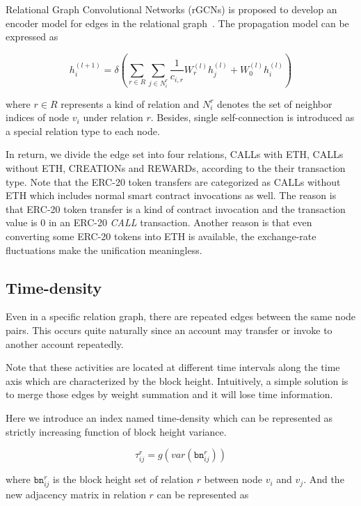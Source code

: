 Relational Graph Convolutional Networks (rGCNs) is proposed to develop an encoder model for edges in the relational graph~\cite{schlichtkrull2018modeling}. The propagation model can be expressed as

\begin{equation}
h_i^{(l+1)}=\delta(\sum_{r\in R} \sum_{j \in N_i^r} \frac{1}{c_{i,r}}W_r^{(l)}h_j^{(l)}+W_0^{(l)}h_i^{(l)})
\label{eq:rgcn}
\end{equation}

where $r \in R$ represents a kind of relation and $N_i^r$ denotes the set of neighbor indices of node $v_i$ under relation $r$. Besides, single self-connection is introduced as a special relation type to each node. %

In return, we divide the edge set into four relations, CALLs with ETH, CALLs without ETH, CREATIONs and REWARDs, according to the their transaction type. Note that the ERC-20 token transfers are categorized as CALLs without ETH which includes normal smart contract invocations as well. The reason is that ERC-20 token transfer is a kind of contract invocation and the transaction value is $0$ in an ERC-20 \emph{CALL} transaction. Another reason is that even converting some ERC-20 tokens into ETH is available, the exchange-rate fluctuations make the unification meaningless.


\subsection{Time-density}
\label{section:time}
Even in a specific relation graph, there are repeated edges between the same node pairs. This occurs quite naturally since an account may transfer or invoke to another account repeatedly.

Note that these activities are located at different time intervals along the time axis which are characterized by the block height. Intuitively, a simple solution is to merge those edges by weight summation and it will lose time information. 

Here we introduce an index named time-density which can be represented as strictly increasing function of block height variance.

\begin{equation}
\tau_{ij}^r=g(var(\texttt{bn}_{ij}^r))
\label{eq:time}
\end{equation}

where $\texttt{bn}_{ij}^{r}$ is the block height set of relation $r$ between node $v_i$ and $v_j$. And the new adjacency matrix in relation $r$ can be represented as 

